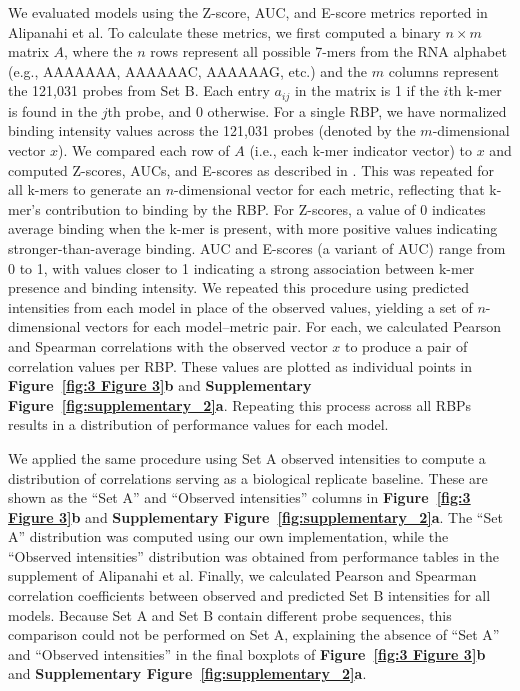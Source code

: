 We evaluated models using the Z-score, AUC, and E-score metrics reported in Alipanahi et al. To calculate these metrics, we first computed a binary $n \times m$ matrix $A$, where the $n$ rows represent all possible 7-mers from the RNA alphabet (e.g., AAAAAAA, AAAAAAC, AAAAAAG, etc.) and the $m$ columns represent the 121{,}031 probes from Set B. Each entry $a_{ij}$ in the matrix is 1 if the $i$th k-mer is found in the $j$th probe, and 0 otherwise. For a single RBP, we have normalized binding intensity values across the 121{,}031 probes (denoted by the $m$-dimensional vector $x$). We compared each row of $A$ (i.e., each k-mer indicator vector) to $x$ and computed Z-scores, AUCs, and E-scores as described in \cite{Alipanahi2015-ef,Ray2013-yd}. This was repeated for all k-mers to generate an $n$-dimensional vector for each metric, reflecting that k-mer's contribution to binding by the RBP. For Z-scores, a value of 0 indicates average binding when the k-mer is present, with more positive values indicating stronger-than-average binding. AUC and E-scores (a variant of AUC) range from 0 to 1, with values closer to 1 indicating a strong association between k-mer presence and binding intensity. We repeated this procedure using predicted intensities from each model in place of the observed values, yielding a set of $n$-dimensional vectors for each model–metric pair. For each, we calculated Pearson and Spearman correlations with the observed vector $x$ to produce a pair of correlation values per RBP. These values are plotted as individual points in \textbf{Figure~\ref{fig:3 Figure 3}\textbf{b}} and \textbf{Supplementary Figure~\ref{fig:supplementary_2}\textbf{a}}. Repeating this process across all RBPs results in a distribution of performance values for each model.

We applied the same procedure using Set A observed intensities to compute a distribution of correlations serving as a biological replicate baseline. These are shown as the “Set A” and “Observed intensities” columns in \textbf{Figure~\ref{fig:3 Figure 3}\textbf{b}} and \textbf{Supplementary Figure~\ref{fig:supplementary_2}\textbf{a}}. The “Set A” distribution was computed using our own implementation, while the “Observed intensities” distribution was obtained from performance tables in the supplement of Alipanahi et al. Finally, we calculated Pearson and Spearman correlation coefficients between observed and predicted Set B intensities for all models. Because Set A and Set B contain different probe sequences, this comparison could not be performed on Set A, explaining the absence of “Set A” and “Observed intensities” in the final boxplots of \textbf{Figure~\ref{fig:3 Figure 3}\textbf{b}} and \textbf{Supplementary Figure~\ref{fig:supplementary_2}\textbf{a}}.

